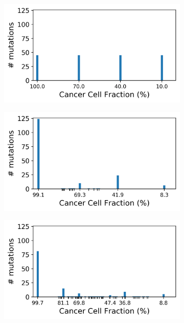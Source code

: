 \documentclass{article}
\begin{document}
\begin{figure}[h]
	\centering
	\begin{subfigure}[t]{0.32\linewidth}
		\centering
		\includegraphics[width = 1.0\linewidth, trim={0 0 0 0}, clip=true]{pyclone_analysis_0_7CN/realcols.png}
	\end{subfigure}%
	\hspace{0.01 \linewidth}
	\begin{subfigure}[t]{0.32\linewidth}
		\centering
		\includegraphics[width = 1.0\linewidth, trim={0 0 0 0}, clip=true]{pyclone_analysis_noCN/cols.png}
	\end{subfigure}%
	\hspace{0.01 \linewidth}
	\begin{subfigure}[t]{0.32\linewidth}
		\centering
		\includegraphics[width = 1.0\linewidth, trim={0 0 0 0}, clip=true]{pyclone_analysis_0_7CN/cols.png}

\end{subfigure}
\end{figure}
\end{document}
